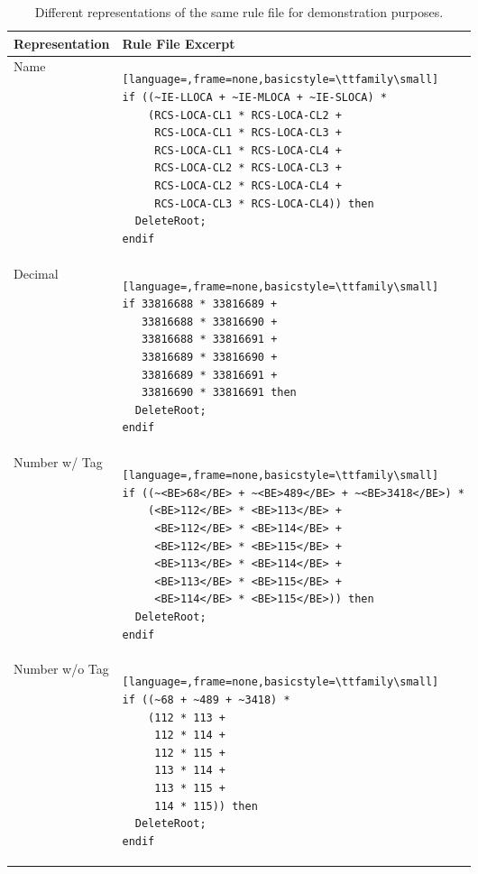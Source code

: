 \begin{table}[H]
\centering
\caption{Different representations of the same rule file for demonstration purposes.}
\label{tab:rule-file-representations}
\begin{tabular}{@{}ll@{}}
\toprule
\textbf{Representation} & \textbf{Rule File Excerpt} \\
\midrule
Name &
\begin{lstlisting}[language=,frame=none,basicstyle=\ttfamily\small]
if ((~IE-LLOCA + ~IE-MLOCA + ~IE-SLOCA) *
    (RCS-LOCA-CL1 * RCS-LOCA-CL2 +
     RCS-LOCA-CL1 * RCS-LOCA-CL3 +
     RCS-LOCA-CL1 * RCS-LOCA-CL4 +
     RCS-LOCA-CL2 * RCS-LOCA-CL3 +
     RCS-LOCA-CL2 * RCS-LOCA-CL4 +
     RCS-LOCA-CL3 * RCS-LOCA-CL4)) then
  DeleteRoot;
endif
\end{lstlisting}
\\
\midrule
Decimal &
\begin{lstlisting}[language=,frame=none,basicstyle=\ttfamily\small]
if 33816688 * 33816689 +
   33816688 * 33816690 +
   33816688 * 33816691 +
   33816689 * 33816690 +
   33816689 * 33816691 +
   33816690 * 33816691 then
  DeleteRoot;
endif
\end{lstlisting}
\\
\midrule
Number w/ Tag &
\begin{lstlisting}[language=,frame=none,basicstyle=\ttfamily\small]
if ((~<BE>68</BE> + ~<BE>489</BE> + ~<BE>3418</BE>) *
    (<BE>112</BE> * <BE>113</BE> +
     <BE>112</BE> * <BE>114</BE> +
     <BE>112</BE> * <BE>115</BE> +
     <BE>113</BE> * <BE>114</BE> +
     <BE>113</BE> * <BE>115</BE> +
     <BE>114</BE> * <BE>115</BE>)) then
  DeleteRoot;
endif
\end{lstlisting}
\\
\midrule
Number w/o Tag &
\begin{lstlisting}[language=,frame=none,basicstyle=\ttfamily\small]
if ((~68 + ~489 + ~3418) *
    (112 * 113 +
     112 * 114 +
     112 * 115 +
     113 * 114 +
     113 * 115 +
     114 * 115)) then
  DeleteRoot;
endif
\end{lstlisting}
\\
\bottomrule
\end{tabular}
\end{table}